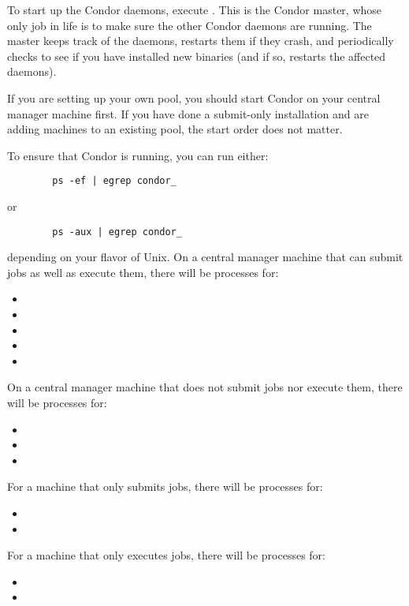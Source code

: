 To start up the Condor daemons, execute
.  This is the Condor master, whose
only job in life is to make sure the other Condor daemons are running.
The master keeps track of the daemons, restarts them if they crash,
and periodically checks to see if you have installed new binaries (and
if so, restarts the affected daemons).

If you are setting up your own pool, you should start Condor on your
central manager machine first.  If you have done a submit-only
installation and are adding machines to an existing pool,
the start order does not
matter.

To ensure that Condor is running, you can run either:
\begin{verbatim}
        ps -ef | egrep condor_
\end{verbatim}
or
\begin{verbatim}
        ps -aux | egrep condor_
\end{verbatim}
depending on your flavor of Unix.  
On a central manager machine that can submit jobs as well
as execute them, there will be processes for:
\begin{itemize}
	\item {}
	\item {}
	\item {}
	\item {}
	\item {}
\end{itemize}
On a central manager machine that does not submit jobs nor
execute them, there will be processes for:
\begin{itemize}
	\item {}
	\item {}
	\item {}
\end{itemize}
For a machine that only submits jobs, there will be processes for:
\begin{itemize}
	\item {}
	\item {}
\end{itemize}
For a machine that only executes jobs, there will be processes for:
\begin{itemize}
	\item {}
	\item {}
\end{itemize}


